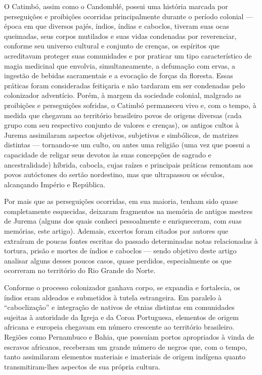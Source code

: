 \begin{refsection}
    O Catimbó, assim como o Candomblé, possui uma história marcada por perseguições e proibições ocorridas principalmente durante o período colonial --- época em que diversos pajés, índios, índias e caboclos, tiveram suas ocas queimadas, seus corpos mutilados e suas vidas condenadas por reverenciar, conforme seu universo cultural e conjunto de crenças, os espíritos que acreditavam proteger suas comunidades e por praticar um tipo característico de magia medicinal que envolvia, simultaneamente, a defumação com ervas, a ingestão de bebidas sacramentais e a evocação de forças da floresta. Essas práticas foram consideradas feitiçaria e não tardaram em ser condenadas pelo colonizador adventício. Porém, à margem da sociedade colonial, malgrado as proibições e perseguições sofridas, o Catimbó permaneceu vivo e, com o tempo, à medida que chegavam ao território brasileiro povos de origens diversas (cada grupo com seu respectivo conjunto de valores e crenças), os antigos cultos à Jurema assimilaram aspectos objetivos, subjetivos e simbólicos, de matrizes distintas --- tornando-se um culto, ou antes uma religião (uma vez que possui a capacidade de religar seus devotos às suas concepções de sagrado e ancestralidade) híbrida, cabocla, cujas raízes e principais práticas remontam aos povos autóctones do sertão nordestino, mas que ultrapassou os séculos, alcançando Império e República. 

    Por mais que as perseguições ocorridas, em sua maioria, tenham sido quase completamente esquecidas, deixaram fragmentos na memória de antigos mestres de Jurema (alguns dos quais conheci pessoalmente e enriqueceram, com suas memórias, este artigo). Ademais, excertos foram citados por autores que extraíram de poucas fontes escritas do passado determinadas notas relacionadas à tortura, prisão e mortes de índios e caboclos --- sendo objetivo deste artigo analisar alguns desses poucos casos, quase perdidos, especialmente os que ocorreram no território do Rio Grande do Norte. 

    Conforme o processo colonizador ganhava corpo, se expandia e fortalecia, os índios eram aldeados e submetidos à tutela estrangeira. Em paralelo à ``caboclização'' e integração de nativos de etnias distintas em comunidades sujeitas à autoridade da Igreja e da Coroa Portuguesa, elementos de origem africana e europeia chegavam em número crescente ao território brasileiro. Regiões como Pernambuco e Bahia, que possuíam portos apropriados à vinda de escravos africanos, receberam um grande número de negros que, com o tempo, tanto assimilaram elementos materiais e imateriais de origem indígena quanto transmitiram-lhes aspectos de sua própria cultura. 


\end{refsection}
